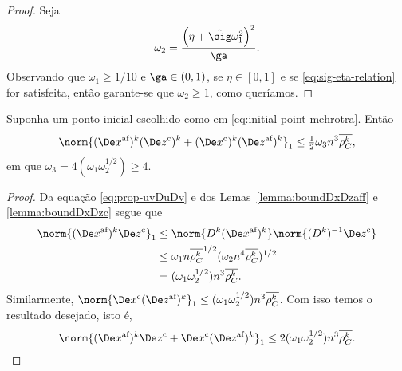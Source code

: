 \begin{proof}
Seja
\begin{equation}
\label{eq:omega2}
	\omega_2 = \frac{\left(\eta +{\nextsig} \omega_1^{2} \right)^{2}}{\ga}.
	\end{equation}
Observando que  $\omega_1 \geq 1/10$ e  $\ga\in(0,1)$,  se $\eta\in[0,1]$ e se \eqref{eq:sig-eta-relation} for satisfeita, então garante-se que $\omega_2\geq 1$, como queríamos. \qedhere





\end{proof}

\begin{lema}\label{lemma:boundDxDzaff-c}
	Suponha um ponto inicial escolhido como em \eqref{eq:initial-point-mehrotra}. Então 
	\begin{equation}\label{eq:lemma-boundDxDzaff-c}
		\norm{ \dekx(\Decoz)^{k} + (\Decox)^{k}  \dekz  }_{1} \leq  \tfrac{1}{2}\omega_{3}n^{3}\dbvec{\rho_C^{k}},
	\end{equation}
em que $\omega_{3} = 4(\omega_1\omega_2^{1/2})\geq 4 $.
\end{lema}

\begin{proof}
	Da equação \eqref{eq:prop-uvDuDv} e dos Lemas~\ref{lemma:boundDxDzaff} e \ref{lemma:boundDxDzc} segue que  
	\[
	\begin{aligned}	
		\norm{ \dekx \Decoz}_{1} & \leq \norm{\Dk \dekx }\norm{\Dik\Decoz}\\
							  & \leq 	\omega_1 n\dbvec{\rho_C^k }^{1/2}(\omega_2 n^{4}\dbvec{\rho_C^k })^{1/2}  \\
							  & = (\omega_1\omega_2^{1/2})n^{3}\dbvec{\rho_C^k }.
	\end{aligned}\]			  
Similarmente, 	$\norm{\Decox \dekz }_{1} \leq (\omega_1\omega_2^{1/2})n^{3}\dbvec{\rho_C^k }$. Com isso temos o resultado desejado, isto é,
\[
		\norm{ \dekx \Decoz + \Decox \dekz }_{1} \leq 2(\omega_1\omega_2^{1/2})n^{3}\dbvec{\rho_C^k }.\qedhere
\]
\end{proof}


